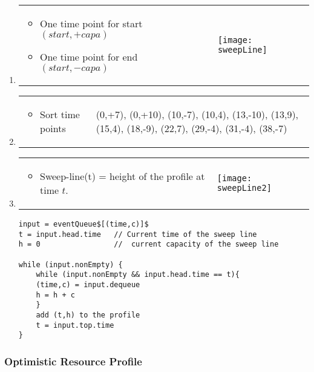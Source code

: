 \begin{enumerate}
    \item \begin{tabular}{m{5cm}m{10cm}}
            \begin{itemize}
                \item One time point for start $(start, +capa)$
                \item One time point for end $(start, -capa)$ 
            \end{itemize}&
                    \texttt{[image: sweepLine]}
                \end{tabular}


            \item \begin{tabular}{m{5cm}m{8cm}}
                    \begin{itemize}
                        \item Sort time points
                    \end{itemize}
                    &

                    (0,+7), (0,+10), (10,-7), (10,4), (13,-10), (13,9), (15,4), (18,-9), (22,7), (29,-4), (31,-4), (38,-7)
                \end{tabular}

            \item \begin{tabular}{m{5cm}m{10cm}}
                    \begin{itemize}
                        \item Sweep-line(t) = height of the profile at time $t$.
                    \end{itemize}
                    &
                    \texttt{[image: sweepLine2]}
                \end{tabular}

                \begin{lstlisting}[mathescape]
input = eventQueue$[(time,c)]$
t = input.head.time   // Current time of the sweep line
h = 0                 //  current capacity of the sweep line 

while (input.nonEmpty) {
    while (input.nonEmpty && input.head.time == t){
    (time,c) = input.dequeue
    h = h + c
    }
    add (t,h) to the profile
    t = input.top.time
}
            \end{lstlisting}
    \end{enumerate}


\subsubsection{Optimistic Resource Profile}

